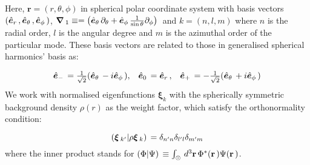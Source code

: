 Here, $\boldsymbol{r} = (r,\theta,\phi)$ in spherical polar coordinate system with basis vectors $(\hat{\bm{e}}_{r}\,,\hat{\bm{e}}_{\theta}\,,\hat{\bm{e}}_{\phi}\,)$, $\bm{\nabla}\,_1 \equiv = \left( \hat{\bm{e}}_{\theta}\,\partial_{\theta} + \hat{\bm{e}}_{\phi}\,\frac{1}{\sin\theta}\partial_{\phi}  \right)\,$ and $k = (n,l,m)$ where $n$ is the radial order, $l$ is the angular degree and $m$ is the azimuthal order of the particular \snr mode.  These basis vectors are related to those in generalised spherical harmonics' basis as:
 
 \begin{equation}
     \begin{array}{ccc} \hat{\bm{e}}_{-}\, = \frac{1}{\sqrt{2}}(\hat{\bm{e}}_{\theta}\, - i \hat{\bm{e}}_{\phi}\,), & \hat{\bm{e}}_{0}\, = \hat{\bm{e}}_{r}\,, & \hat{\bm{e}}_{+}\, = -\frac{1}{\sqrt{2}}(\hat{\bm{e}}_{\theta}\, + i \hat{\bm{e}}_{\phi}\,) \\ \end{array}
 \end{equation}
We work with normalised eigenfunctions $\boldsymbol{\xi}_k$ with the spherically symmetric background density $\rho(r)$ as the weight factor, which satisfy the orthonormality condition:

\begin{equation} \label{eqn: orthonormality}
  (\bm{\xi}\,_{k'}|\rho\bm{\xi}\,_{k})\, = \delta_{n'n} \delta_{l' l} \delta_{m' m}  
\end{equation}
where the inner product \inner{}{} stands for $(\Phi|\Psi)\, \equiv \int_{\odot} \, d^3\mathbf{r}\, \Phi^*(\mathbf{r}\,) \Psi(\mathbf{r}\,)$.

